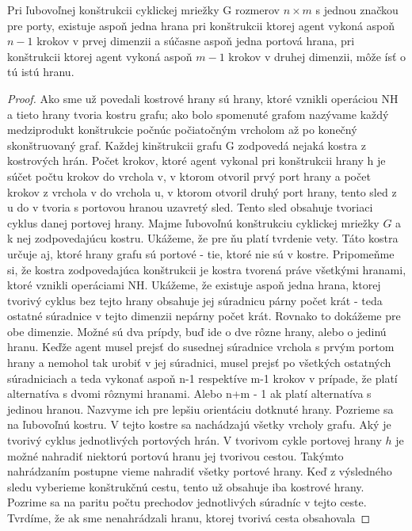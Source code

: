 \begin{veta}
Pri ľubovoľnej konštrukcii cyklickej mriežky G rozmerov $n \times m$ s jednou značkou
pre porty, existuje aspoň jedna hrana pri konštrukcii ktorej agent vykoná 
aspoň $n - 1$ krokov v prvej dimenzii
a súčasne aspoň jedna portová hrana,
 pri konštrukcii ktorej agent vykoná aspoň $m - 1$ krokov v druhej dimenzii,
môže ísť o tú istú hranu.
\end{veta}
\begin{proof}
Ako sme už povedali kostrové hrany sú hrany, ktoré vznikli operáciou NH a
tieto hrany tvoria kostru grafu; ako bolo spomenuté grafom nazývame každý
medziprodukt konštrukcie počnúc počiatočným vrcholom až po konečný
skonštruovaný graf.
Každej kinštrukcii grafu G zodpovedá nejaká kostra z kostrových hrán. Počet
krokov, ktoré agent vykonal pri konštrukcii hrany h je súčet počtu krokov do
vrchola v, v ktorom otvoril prvý port hrany a počet krokov z vrchola v do
vrchola u, v ktorom otvoril druhý port hrany, 
tento sled z u do v tvoria s portovou
hranou uzavretý sled. Tento sled obsahuje tvoriaci cyklus danej portovej
hrany.
Majme ľubovoľnú konštrukciu cyklickej mriežky $G$ a k nej zodpovedajúcu
kostru. Ukážeme, že pre ňu platí tvrdenie vety.
Táto kostra určuje aj, ktoré hrany grafu sú portové - tie, ktoré nie sú v
kostre. Pripomeňme si, že kostra zodpovedajúca konštrukcii je kostra tvorená
práve všetkými hranami, ktoré vznikli operáciami NH.
Ukážeme, že existuje aspoň jedna hrana, ktorej tvorivý cyklus bez tejto
hrany obsahuje jej
súradnicu párny počet krát - teda ostatné súradnice v tejto dimenzii nepárny
počet krát. Rovnako to dokážeme pre obe dimenzie. Možné sú dva prípdy, buď
ide o dve rôzne hrany, alebo o jedinú hranu.
Keďže agent musel prejsť do susednej súradnice vrchola s prvým portom hrany
a nemohol tak urobiť v jej súradnici, musel prejsť po všetkých ostatných
súradniciach a teda vykonať aspoň n-1 respektíve m-1 krokov v prípade, že
platí alternatíva s dvomi rôznymi hranami. Alebo n+m - 1 ak platí
alternatíva s jedinou hranou. Nazvyme ich pre lepšiu orientáciu dotknuté
hrany.
Pozrieme sa na ľubovoľnú kostru. V tejto kostre sa nachádzajú všetky vrcholy
grafu. Aký je tvorivý cyklus jednotlivých portových hrán. V tvorivom cykle
portovej hrany $h$
je možné nahradiť niektorú portovú hranu jej tvorivou cestou. Takýmto
nahrádzaním postupne vieme nahradiť všetky portové hrany. Keď z výsledného
sledu vyberieme konštrukčnú cestu, tento už obsahuje iba kostrové hrany.
Pozrime sa na paritu počtu prechodov jednotlivých súradníc v tejto ceste.
Tvrdíme, že ak sme nenahrádzali hranu, ktorej tvorivá cesta obsahovala

\end{proof}
